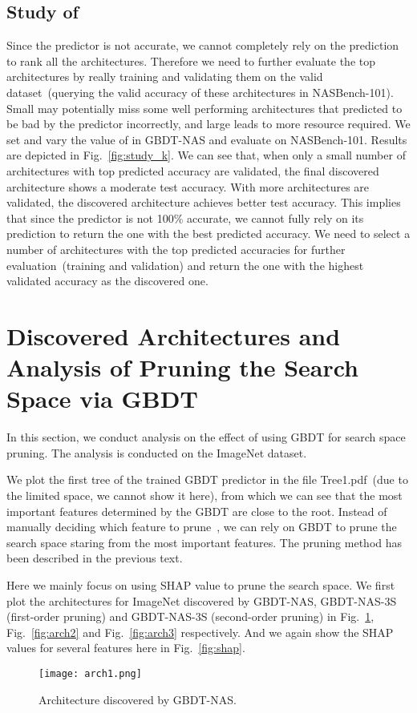 \documentclass{article}
\begin{document}
\subsection{Study of }
Since the predictor is not  accurate, we cannot completely rely on the prediction to rank all the architectures. Therefore we need to further evaluate the top  architectures by really training and validating them on the valid dataset~(querying the valid accuracy of these architectures in NASBench-101). Small  may potentially miss some well performing architectures that predicted to be bad by the predictor incorrectly, and large  leads to more resource required. We set  and vary the value of  in GBDT-NAS and evaluate on NASBench-101. Results are depicted in Fig.~\ref{fig:study_k}. We can see that, when only a small number of architectures with top predicted accuracy are validated, the final discovered architecture shows a moderate test accuracy. With more architectures are validated, the discovered architecture achieves better test accuracy. This implies that since the predictor is not 100\% accurate, we cannot fully rely on its prediction to return the one with the best predicted accuracy. We need to select a number of architectures with the top predicted accuracies for further evaluation~(training and validation) and return the one with the highest validated accuracy as the discovered one.


\section{Discovered Architectures and Analysis of Pruning the Search Space via GBDT}
In this section, we conduct analysis on the effect of using GBDT for search space pruning. The analysis is conducted on the ImageNet dataset. 

We plot the first tree of the trained GBDT predictor in the file Tree1.pdf~(due to the limited space, we cannot show it here), from which we can see that the most important features determined by the GBDT are close to the root. Instead of manually deciding which feature to prune~\cite{designspace}, we can rely on GBDT to prune the search space staring from the most important features. The pruning method has been described in the previous text. 

Here we mainly focus on using SHAP value to prune the search space. We first plot the architectures for ImageNet discovered by GBDT-NAS, GBDT-NAS-3S (first-order pruning) and GBDT-NAS-3S (second-order pruning) in Fig.~\ref{fig:arch1}, Fig.~\ref{fig:arch2} and Fig.~\ref{fig:arch3} respectively. And we again show the SHAP values for several features here in Fig.~\ref{fig:shap}.
\begin{figure}[htbp]
\centering
\texttt{[image: arch1.png]}
\caption{Architecture discovered by GBDT-NAS.}
\label{fig:arch1}
\end{figure}
\end{document}
